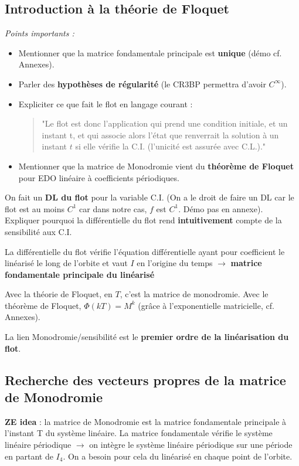 \documentclass[12pt]{article}
\begin{document}
	\subsection{Introduction à la théorie de Floquet}
	\textit{Points importants :}
	\begin{itemize}
		\item Mentionner que la matrice fondamentale principale est \textbf{unique} (démo cf. Annexes).
		\item Parler des \textbf{hypothèses de régularité} (le CR3BP permettra d'avoir $C^\infty$).
		\item Expliciter ce que fait le flot en langage courant : 
			\begin{quotation}
				"Le flot est donc l'application qui prend une condition initiale, et un instant t, et qui associe alors l'état que renverrait la solution à un instant $t$ si elle vérifie la C.I. (l'unicité est assurée avec C.L.)."
			\end{quotation}
		\item Mentionner que la matrice de Monodromie vient du \textbf{théorème de Floquet} pour EDO linéaire à coefficients périodiques.
	\end{itemize}
	
	\bigskip
	
	On fait un \textbf{DL du flot} pour la variable C.I. (On a le droit de faire un DL car le flot est au moins $C^1$ car dans notre cas, $f$ est $C^1$. Démo pas en annexe). Expliquer pourquoi la différentielle du flot rend \textbf{intuitivement} compte de la sensibilité aux C.I.
	
	La différentielle du flot vérifie l'équation différentielle ayant pour coefficient le linéarisé le long de l'orbite et vaut $I$ en l'origine du temps $\to$ \textbf{matrice fondamentale principale du linéarisé}
	
	Avec la théorie de Floquet, en $T$, c'est la matrice de monodromie. Avec le théorème de Floquet, $\Phi(kT) = M^k$ (grâce à l'exponentielle matricielle, cf. Annexes).
	
	La lien Monodromie/sensibilité est le \textbf{premier ordre de la linéarisation du flot}.
	
	
	\subsection{Recherche des vecteurs propres de la matrice de Monodromie}
	\textbf{ZE idea} : la matrice de Monodromie est la matrice fondamentale principale à l'instant T du système linéaire. La matrice fondamentale vérifie le système linéaire périodique $\to$ on intègre le système linéaire périodique sur une période en partant de $I_4$. On a besoin pour cela du linéarisé en chaque point de l'orbite.
	
\end{document}
